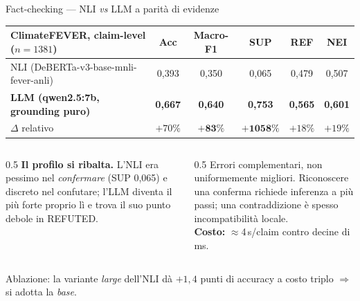 \documentclass[aspectratio=169,11pt]{beamer}
\begin{document}
\begin{frame}{Fact-checking --- NLI \emph{vs} LLM a parità di evidenze}
  \centering\small
  \begin{tabular}{lccccc}
    \toprule
    \textbf{ClimateFEVER, claim-level} ($n{=}1381$) & Acc & \textbf{Macro-F1} & SUP & REF & NEI \\
    \midrule
    NLI (DeBERTa-v3-base-mnli-fever-anli) & 0,393 & 0,350 & 0,065 & 0,479 & 0,507 \\
    \textbf{LLM (qwen2.5:7b, grounding puro)} & \textbf{0,667} & \textbf{0,640} & \textbf{0,753} & \textbf{0,565} & \textbf{0,601} \\
    \midrule
    $\Delta$ relativo & $+70\%$ & $\boldsymbol{+83\%}$ & $\boldsymbol{+1058\%}$ & $+18\%$ & $+19\%$ \\
    \bottomrule
  \end{tabular}
  \vspace{0.7em}
  \begin{columns}[T]
    \begin{column}{0.5\textwidth}
      \footnotesize
      \textbf{Il profilo si ribalta.} L'NLI era pessimo nel \emph{confermare}
      (SUP 0,065) e discreto nel confutare; l'LLM diventa il più forte proprio lì e trova
      il suo punto debole in REFUTED.
    \end{column}
    \begin{column}{0.5\textwidth}
      \footnotesize
      Errori \alert{complementari}, non uniformemente migliori. Riconoscere una conferma
      richiede inferenza a più passi; una contraddizione è spesso incompatibilità locale.\\[0.3em]
      \textbf{Costo:} $\approx$4\,s/claim contro decine di ms.
    \end{column}
  \end{columns}
  \vspace{0.2em}
  {\scriptsize\color{echoslate} Ablazione: la variante \emph{large} dell'NLI dà $+1{,}4$ punti
  di accuracy a costo triplo $\Rightarrow$ si adotta la \emph{base}.}
\end{frame}
\end{document}
